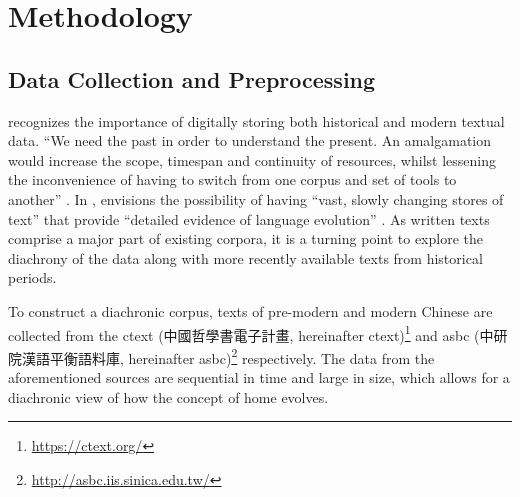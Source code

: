 

\chapter{Methodology}

\section{Data Collection and Preprocessing}
\textcite{renouf2002time} recognizes the importance of digitally storing both historical and modern textual data. ``We need the past in order to understand the present. An amalgamation would increase the scope, timespan and continuity of resources, whilst lessening the inconvenience of having to switch from one corpus and set of tools to another'' \parencite{renouf2002time}. In \cite*{sinclair1982reflections}, \citeauthor{sinclair1982reflections} envisions the possibility of having ``vast, slowly changing stores of text'' that provide ``detailed evidence of language evolution'' . As written texts comprise a major part of existing corpora, it is a turning point to explore the diachrony of the data along with more recently available texts from historical periods.

To construct a diachronic corpus, texts of pre-modern and modern Chinese are collected from the \acrlong{ctext} (中國哲學書電子計畫, hereinafter \acrshort{ctext})\footnote{\url{https://ctext.org/}} \parencite{sturgeon2019ctext} and \acrlong{asbc} (中研院漢語平衡語料庫, hereinafter \acrshort{asbc})\footnote{\url{http://asbc.iis.sinica.edu.tw/}} \parencite{chen1996sinica} respectively. The data from the aforementioned sources are sequential in time and large in size, which allows for a diachronic view of how the concept of home evolves.

